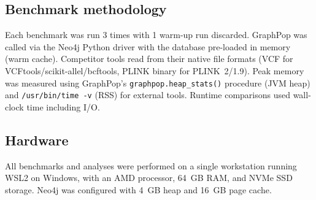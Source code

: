 \subsection*{Benchmark methodology}

Each benchmark was run 3 times with 1 warm-up run discarded. GraphPop was called via the Neo4j Python driver with the database pre-loaded in memory (warm cache). Competitor tools read from their native file formats (VCF for VCFtools/scikit-allel/bcftools, PLINK binary for PLINK~2/1.9). Peak memory was measured using GraphPop's \texttt{graphpop.heap\_stats()} procedure (JVM heap) and \texttt{/usr/bin/time -v} (RSS) for external tools. Runtime comparisons used wall-clock time including I/O.

\subsection*{Hardware}

All benchmarks and analyses were performed on a single workstation running WSL2 on Windows, with an AMD processor, 64~GB RAM, and NVMe SSD storage. Neo4j was configured with 4~GB heap and 16~GB page cache.
